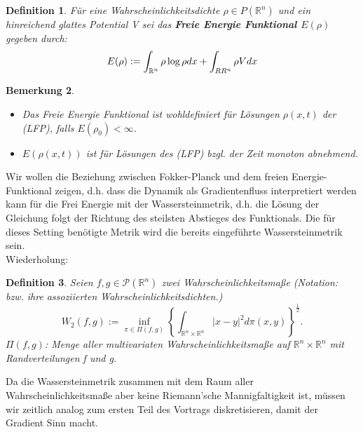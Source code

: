 \documentclass[11pt,a4paper,notitlepage]{scrreprt}
\newcommand{\RR}{\mathbb{R}}
\newtheorem{defi}{Definition}[section]
\newtheorem{bem}[defi]{Bemerkung}
\begin{document}
\begin{defi}
Für eine Wahrscheinlichkeitsdichte $\rho\in P(\RR^n)$ und ein hinreichend glattes Potential V sei das \textbf{Freie Energie Funktional $E(\rho)$} gegeben durch:
\begin{equation}
E(\rho):=\int_{\RR^n} \rho\log\rho dx + \int_{\\RR^n}\rho V dx \label{FEFktn}
\end{equation}
\end{defi}

\begin{bem}
\begin{itemize}
\item Das Freie Energie Funktional ist wohldefiniert für Lösungen $\rho(x,t)$ der (LFP), falls $E(\rho_0)<\infty$.
\item $E(\rho(x,t))$ ist für Lösungen des (LFP) bzgl. der Zeit monoton abnehmend.\end{itemize}
\end{bem}

Wir wollen die Beziehung zwischen Fokker-Planck und dem freien Energie-Funktional zeigen, d.h. dass die Dynamik als Gradientenfluss interpretiert werden kann für die Frei Energie mit der Wassersteinmetrik, d.h. die Lösung der Gleichung folgt der Richtung des steilsten Abstieges des Funktionals. Die für dieses Setting benötigte Metrik wird die bereits eingeführte Wassersteinmetrik sein. \\

Wiederholung:
\begin{defi}
Seien $f,g\in\mathcal{P}(\RR^n)$ zwei Wahrscheinlichkeitsmaße (Notation: bzw. ihre assoziierten Wahrscheinlichkeitsdichten.)
\begin{equation}
W_2(f,g):=\inf_{\pi \in \Pi(f,g)} \left\{ \int_{\RR^n\times\RR^n} \vert x-y \vert^2 d\pi(x,y)\right\}^\frac{1}{2}.\label{W2}
\end{equation}
$\Pi(f,g)$: Menge aller multivariaten Wahrscheinlichkeitsmaße auf $\RR^n \times \RR^n$ mit Randverteilungen f und g.
\end{defi}
Da die Wassersteinmetrik zusammen mit dem Raum aller Wahrscheinlichkeitsmaße aber keine Riemann'sche Mannigfaltigkeit ist, müssen wir zeitlich analog zum ersten Teil des Vortrags diskretisieren, damit der Gradient Sinn macht.\\
\end{document}
